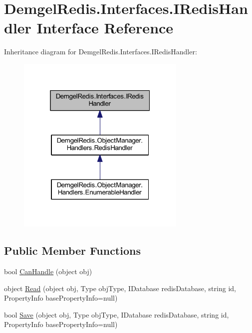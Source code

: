 \hypertarget{interface_demgel_redis_1_1_interfaces_1_1_i_redis_handler}{}\section{Demgel\+Redis.\+Interfaces.\+I\+Redis\+Handler Interface Reference}
\label{interface_demgel_redis_1_1_interfaces_1_1_i_redis_handler}


Inheritance diagram for Demgel\+Redis.\+Interfaces.\+I\+Redis\+Handler\+:
\nopagebreak
\begin{figure}[H]
\begin{center}
\leavevmode
\includegraphics[width=229pt]{interface_demgel_redis_1_1_interfaces_1_1_i_redis_handler__inherit__graph}
\end{center}
\end{figure}
\subsection*{Public Member Functions}
\begin{DoxyCompactItemize}
\item 
bool \hyperlink{interface_demgel_redis_1_1_interfaces_1_1_i_redis_handler_a834f8f6fb03ed770295205df1d395c76}{Can\+Handle} (object obj)
\item 
object \hyperlink{interface_demgel_redis_1_1_interfaces_1_1_i_redis_handler_a04550ae73923a29c2709850a7b299d94}{Read} (object obj, Type obj\+Type, I\+Database redis\+Database, string id, Property\+Info base\+Property\+Info=null)
\item 
bool \hyperlink{interface_demgel_redis_1_1_interfaces_1_1_i_redis_handler_abab252e162cbe78ce5a79202d45efa30}{Save} (object obj, Type obj\+Type, I\+Database redis\+Database, string id, Property\+Info base\+Property\+Info=null)
\end{DoxyCompactItemize}


